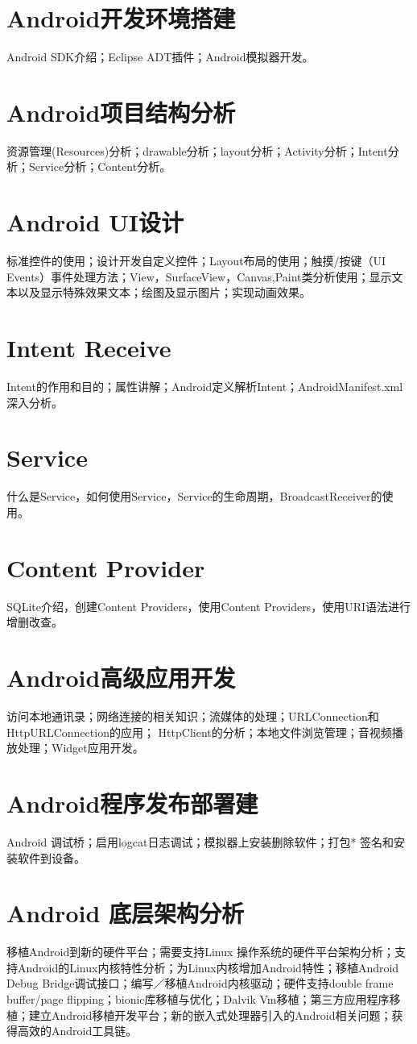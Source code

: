 \documentclass[9pt, b5paper]{article}
\begin{document}
\section{Android开发环境搭建}
\label{sec-8}
Android SDK介绍；Eclipse ADT插件；Android模拟器开发。
\section{Android项目结构分析}
\label{sec-9}
资源管理(Resources)分析；drawable分析；layout分析；Activity分析；Intent分析；Service分析；Content分析。
\section{Android UI设计}
\label{sec-10}
标准控件的使用；设计开发自定义控件；Layout布局的使用；触摸/按键（UI Events）事件处理方法；View，SurfaceView，Canvas,Paint类分析使用；显示文本以及显示特殊效果文本；绘图及显示图片；实现动画效果。
\section{Intent Receive}
\label{sec-11}
Intent的作用和目的；属性讲解；Android定义解析Intent；AndroidManifest.xml深入分析。
\section{Service}
\label{sec-12}
什么是Service，如何使用Service，Service的生命周期，BroadcastReceiver的使用。
\section{Content Provider}
\label{sec-13}
SQLite介绍，创建Content Providers，使用Content Providers，使用URI语法进行增删改查。
\section{Android高级应用开发}
\label{sec-14}
访问本地通讯录；网络连接的相关知识；流媒体的处理；URLConnection和HttpURLConnection的应用；
HttpClient的分析；本地文件浏览管理；音视频播放处理；Widget应用开发。
\section{Android程序发布部署建}
\label{sec-15}
Android 调试桥；启用logcat日志调试；模拟器上安装删除软件；打包* 签名和安装软件到设备。
\section{Android 底层架构分析}
\label{sec-16}
移植Android到新的硬件平台；需要支持Linux 操作系统的硬件平台架构分析；支持Android的Linux内核特性分析；为Linux内核增加Android特性；移植Android Debug Bridge调试接口；编写／移植Android内核驱动；硬件支持double frame buffer/page flipping；bionic库移植与优化；Dalvik Vm移植；第三方应用程序移植；建立Android移植开发平台；新的嵌入式处理器引入的Android相关问题；获得高效的Android工具链。
\end{document}
